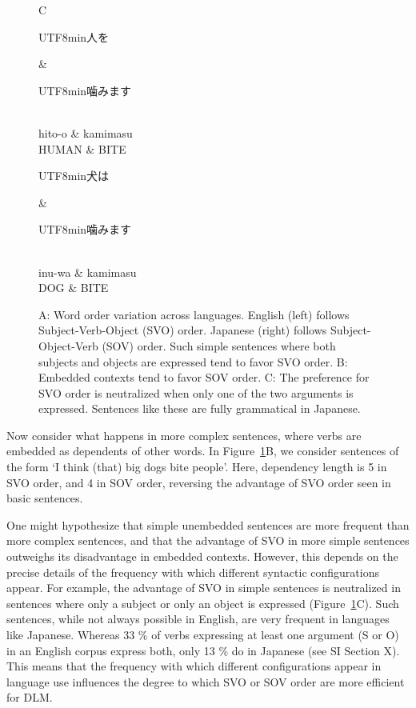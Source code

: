 \documentclass[11pt,a4paper]{article}
\newcommand{\japanese}[1]{\begin{CJK}{UTF8}{min}#1\end{CJK}}
\begin{document}
\begin{figure}
C
\begin{dependency}[theme = simple]
   \begin{deptext}[column sep=1em]
   \japanese{人を} \& \japanese{噛みます}\\ 
   hito-o \& kamimasu \\
   HUMAN \& BITE  \\
   \end{deptext}
\end{dependency}
\begin{dependency}[theme = simple]
   \begin{deptext}[column sep=1em]
   \japanese{犬は} \& \japanese{噛みます}\\ 
   inu-wa \& kamimasu \\
          DOG \& BITE  \\
   \end{deptext}
\end{dependency}

        \caption{A: Word order variation across languages. English (left) follows Subject-Verb-Object (SVO) order. Japanese (right) follows Subject-Object-Verb (SOV) order. Such simple sentences where both subjects and objects are expressed tend to favor SVO order. B: Embedded contexts tend to favor SOV order. C: The preference for SVO order is neutralized when only one of the two arguments is expressed. Sentences like these are fully grammatical in Japanese.}
        \label{fig:sent-dep}
\end{figure}

Now consider what happens in more complex sentences, where verbs are embedded as dependents of other words.
In Figure~\ref{fig:sent-dep}B, we consider sentences of the form `I think (that) big dogs bite people'.
Here, dependency length is 5 in SVO order, and 4 in SOV order, reversing the advantage  of SVO order seen in basic sentences.

One might hypothesize that simple unembedded sentences are more frequent than more complex sentences, and that the advantage of SVO in more simple sentences outweighs its disadvantage in embedded contexts.
However, this depends on the precise details of the frequency with which different syntactic configurations appear.
For example, the advantage of SVO in simple sentences is neutralized in sentences where only a subject or only an object is expressed (Figure~\ref{fig:sent-dep}C).
Such sentences, while not always possible in English, are very frequent in languages like Japanese.
Whereas 33 \%  of verbs expressing at least one argument (S or O) in an English corpus express both, only 13 \% do in Japanese (see SI Section X).
This means that the frequency with which different configurations appear in language use influences the degree to which SVO or SOV order are more efficient for DLM.
\end{document}
